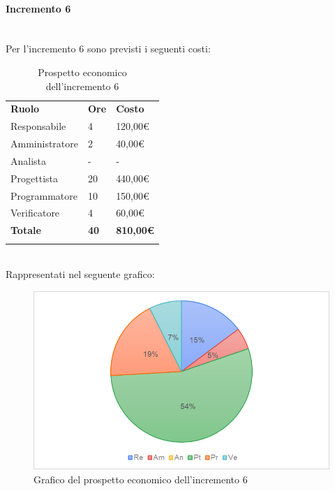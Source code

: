 \paragraph{Incremento 6} \mbox{} \\
Per l'incremento 6 sono previsti i seguenti costi:
\begin{longtable} {
		>{}p{32mm}
		>{}p{20mm}
		>{}p{20mm}
	}
	\rowcolor{gray!50}
	
	\textbf{Ruolo} & \textbf{Ore} & \textbf{Costo} \TBstrut \\
	Responsabile & 4 & 120,00\euro{} \TBstrut \\
	Amministratore & 2 & 40,00\euro{} \TBstrut \\
	Analista & - & - \TBstrut \\
	Progettista & 20 & 440,00\euro{}\TBstrut \\
	Programmatore & 10 & 150,00\euro{} \TBstrut \\
	Verificatore & 4 & 60,00\euro{} \TBstrut \\
	\textbf{Totale} & \textbf{40}& \textbf{810,00\euro{}} \TBstrut \\	
	\rowcolor{white}
	\caption{Prospetto economico dell'incremento 6}
\end{longtable} \mbox{} \\
Rappresentati nel seguente grafico: \mbox{}
\begin{figure} [H]
	\includegraphics[width=\linewidth]{./img/Grafici/25.png}
	\caption{Grafico del prospetto economico dell'incremento 6}
\end{figure}
